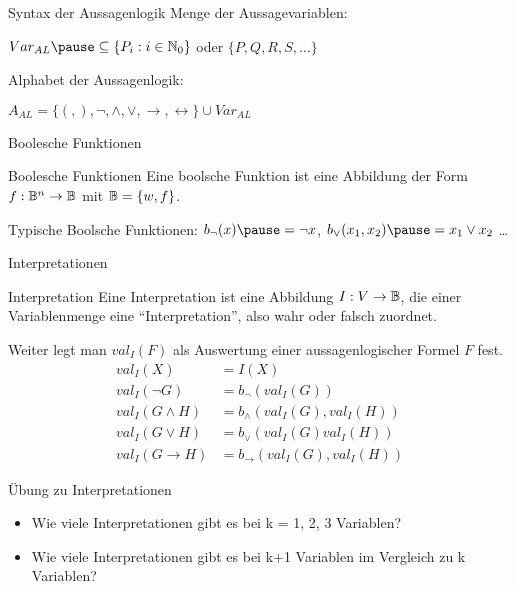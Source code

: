 \documentclass[handout]{beamer}
\begin{document}
\begin{frame}{Syntax der Aussagenlogik}
	\pause
	Menge der Aussagevariablen:
	
	\pause\quad $Var_{AL} \pause \subseteq \{P_i : i \in \N_0\}$ \pause oder $\{P, Q, R, S, \dots\}$
	
	\pause Alphabet der Aussagenlogik:
	
	\pause\quad $A_{AL} = \{(, ), \lnot, \land, \lor, \rightarrow, \leftrightarrow\} \cup Var_{AL}$
\end{frame}

\begin{frame}{Boolesche Funktionen}
\begin{block}{Boolesche Funktionen}
	Eine boolsche Funktion ist eine Abbildung \pause der Form $f: \mathbb{B}^n \rightarrow \mathbb{B}$ \pause mit $\mathbb{B} = \{w, f\}$.
\end{block}

Typische Boolsche Funktionen\pause : $b_\lnot (x) \pause = \lnot x$\pause , $b_\lor (x_1, x_2) \pause = x_1 \lor x_2$ \dots
\end{frame}

\begin{frame}{Interpretationen}
	\begin{block}{Interpretation}
		\pause Eine Interpretation ist eine Abbildung $I : V \rightarrow \mathbb{B}$\pause , die einer Variablenmenge eine ``Interpretation''\pause , also wahr oder falsch zuordnet.
	\end{block}

\pause Weiter legt man $val_I(F)$ als Auswertung einer aussagenlogischer Formel $F$ fest.
\pause
	\newcommand{\val}{val}
	\begin{align*}
	\val_I(X)         &= I(X) \\
	\val_I(\lnot G)   &= b_{\lnot}(\val_I(G)) \\
	\val_I(G \land H) &= b_{\land}(\val_I(G), \val_I(H)) \\
	\val_I(G \lor H)  &= b_{\lor}(\val_I(G)  \val_I(H)) \\
	\val_I(G \rightarrow H)&= b_{\rightarrow}(\val_I(G), \val_I(H))
	\end{align*}
\end{frame}

\begin{frame}{Übung zu Interpretationen}
	
	
	\begin{itemize}
		\item Wie viele Interpretationen gibt es bei k = 1, 2, 3 Variablen?
		\item Wie viele Interpretationen gibt es bei k+1 Variablen im Vergleich zu k Variablen?
	\end{itemize}
	
\end{frame}	
\end{document}
